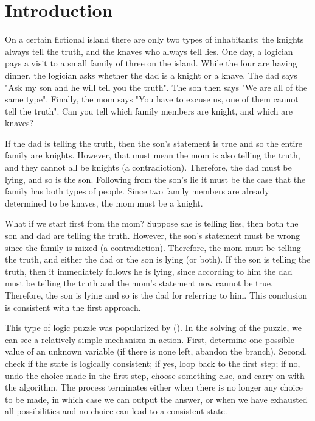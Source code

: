 \section{Introduction}

On a certain fictional island there are only two types of inhabitants: the knights always tell the truth, and the knaves who always tell lies. One day, a logician pays a visit to a small family of three on the island. While the four are having dinner, the logician asks whether the dad is a knight or a knave. The dad says "Ask my son and he will tell you the truth". The son then says "We are all of the same type". Finally, the mom says "You have to excuse us, one of them cannot tell the truth". Can you tell which family members are knight, and which are knaves?

If the dad is telling the truth, then the son's statement is true and so the entire family are knights. However, that must mean the mom is also telling the truth, and they cannot all be knights (a contradiction). Therefore, the dad must be lying, and so is the son. Following from the son's lie it must be the case that the family has both types of people. Since two family members are already determined to be knaves, the mom must be a knight.

What if we start first from the mom? Suppose she is telling lies, then both the son and dad are telling the truth. However, the son's statement must be wrong since the family is mixed (a contradiction). Therefore, the mom must be telling the truth, and either the dad or the son is lying (or both). If the son is telling the truth, then it immediately follows he is lying, since according to him the dad must be telling the truth and the mom's statement now cannot be true. Therefore, the son is lying and so is the dad for referring to him. This conclusion is consistent with the first approach.

This type of logic puzzle was popularized by (\cite{knight}). In the solving of the puzzle, we can see a relatively simple mechanism in action. First, determine one possible value of an unknown variable (if there is none left, abandon the branch). Second, check if the state is logically consistent; if yes, loop back to the first step; if no, undo the choice made in the first step, choose something else, and carry on with the algorithm. The process terminates either when there is no longer any choice to be made, in which case we can output the answer, or when we have exhausted all possibilities and no choice can lead to a consistent state.

